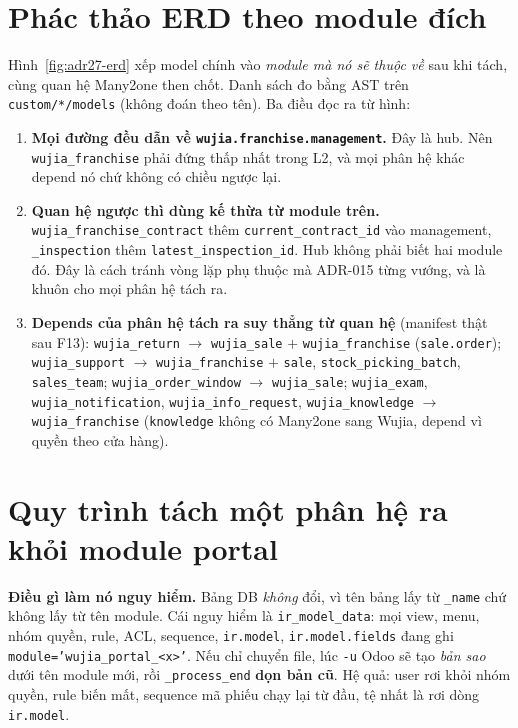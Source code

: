 \section{Phác thảo ERD theo module đích}

Hình~\ref{fig:adr27-erd} xếp model chính vào \emph{module mà nó sẽ thuộc về} sau khi tách, cùng
quan hệ Many2one then chốt. Danh sách đo bằng AST trên \texttt{custom/*/models} (không đoán theo
tên). Ba điều đọc ra từ hình:

\begin{enumerate}
\item \textbf{Mọi đường đều dẫn về \texttt{wujia.franchise.management}.} Đây là hub. Nên
  \texttt{wujia\_franchise} phải đứng thấp nhất trong L2, và mọi phân hệ khác depend nó chứ không
  có chiều ngược lại.
\item \textbf{Quan hệ ngược thì dùng kế thừa từ module trên.} \texttt{wujia\_franchise\_contract}
  thêm \texttt{current\_contract\_id} vào management, \texttt{\_inspection} thêm
  \texttt{latest\_inspection\_id}. Hub không phải biết hai module đó. Đây là cách tránh vòng lặp
  phụ thuộc mà ADR-015 từng vướng, và là khuôn cho mọi phân hệ tách ra.
\item \textbf{Depends của phân hệ tách ra suy thẳng từ quan hệ} (manifest thật sau F13):
  \texttt{wujia\_return} $\rightarrow$ \texttt{wujia\_sale} $+$ \texttt{wujia\_franchise} (\texttt{sale.order});
  \texttt{wujia\_support} $\rightarrow$ \texttt{wujia\_franchise} $+$ \texttt{sale},
  \texttt{stock\_picking\_batch}, \texttt{sales\_team}; \texttt{wujia\_order\_window} $\rightarrow$
  \texttt{wujia\_sale}; \texttt{wujia\_exam}, \texttt{wujia\_notification},
  \texttt{wujia\_info\_request}, \texttt{wujia\_knowledge} $\rightarrow$ \texttt{wujia\_franchise}
  (\texttt{knowledge} không có Many2one sang Wujia, depend vì quyền theo cửa hàng).
\end{enumerate}

\adrErdFigure

\section{Quy trình tách một phân hệ ra khỏi module portal}
\label{sec:adr27-xmlid}

\textbf{Điều gì làm nó nguy hiểm.} Bảng DB \emph{không} đổi, vì tên bảng lấy từ \texttt{\_name}
chứ không lấy từ tên module. Cái nguy hiểm là \texttt{ir\_model\_data}: mọi view, menu, nhóm quyền,
rule, ACL, sequence, \texttt{ir.model}, \texttt{ir.model.fields} đang ghi
\texttt{module='wujia\_portal\_<x>'}. Nếu chỉ chuyển file, lúc \texttt{-u} Odoo sẽ tạo \emph{bản
sao} dưới tên module mới, rồi \texttt{\_process\_end} \textbf{dọn bản cũ}. Hệ quả: user rơi khỏi
nhóm quyền, rule biến mất, sequence mã phiếu chạy lại từ đầu, tệ nhất là rơi dòng
\texttt{ir.model}.

